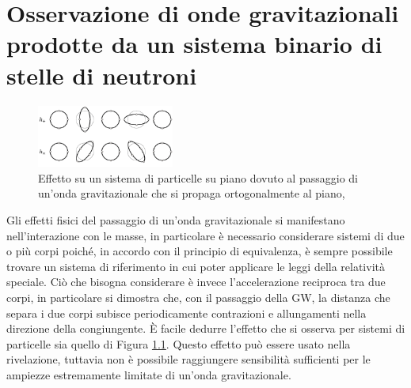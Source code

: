 \chapter[Osservazioni di onde gravtazionali]{Osservazione di onde gravitazionali prodotte da un sistema binario di stelle di neutroni}
\label{chapter:gw170817}
\begin{figure}
	\vspace{-10pt}
	\begin{center}
		\includegraphics[width=0.4\textwidth]{figures/Capitolo_2/gw_effect.png}
	\end{center}
	\vspace{-5pt}
	\caption{Effetto su un sistema di particelle su piano dovuto al passaggio di un'onda gravitazionale che si propaga ortogonalmente al piano, \cite{universe3030059}}
	\label{fig:gweffect}
	\vspace{-10pt}
\end{figure}
Gli effetti fisici del passaggio di un'onda gravitazionale si manifestano nell'interazione con le masse, in particolare è necessario considerare sistemi di due o più corpi poiché, in accordo con il principio di equivalenza, è sempre possibile trovare un sistema di riferimento in cui poter applicare le leggi della relatività speciale. Ciò che bisogna considerare è invece l'accelerazione reciproca tra due corpi, in particolare si dimostra che, con il passaggio della GW, la distanza che separa i due corpi subisce periodicamente contrazioni e allungamenti nella direzione della congiungente.
È facile dedurre l'effetto che si osserva per sistemi di particelle sia quello di Figura \ref{fig:gweffect}. Questo effetto può essere usato nella rivelazione, tuttavia non è possibile raggiungere sensibilità sufficienti per le ampiezze estremamente limitate di un'onda gravitazionale. 

